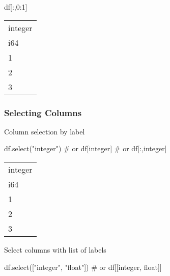 \documentclass[
  letterpaper,
  DIV=11,
  numbers=noendperiod]{scrartcl}
\newenvironment{Shaded}{\begin{snugshade}}{\end{snugshade}}
\newcommand{\CommentTok}[1]{\textcolor[rgb]{0.37,0.37,0.37}{#1}}
\newcommand{\DecValTok}[1]{\textcolor[rgb]{0.68,0.00,0.00}{#1}}
\newcommand{\NormalTok}[1]{\textcolor[rgb]{0.00,0.23,0.31}{#1}}
\newcommand{\StringTok}[1]{\textcolor[rgb]{0.13,0.47,0.30}{#1}}
\begin{document}
\begin{Shaded}
\begin{Highlighting}[]
\NormalTok{df[:,}\DecValTok{0}\NormalTok{:}\DecValTok{1}\NormalTok{]}
\end{Highlighting}
\end{Shaded}

\begin{longtable}[]{@{}l@{}}
\toprule()
integer \\
i64 \\
\midrule()
\endhead
1 \\
2 \\
3 \\
\bottomrule()
\end{longtable}

\hypertarget{selecting-columns}{%
\subsubsection{Selecting Columns}\label{selecting-columns}}

Column selection by label

\begin{Shaded}
\begin{Highlighting}[]
\NormalTok{df.select(}\StringTok{"integer"}\NormalTok{)}
\CommentTok{\# or df[\textquotesingle{}integer\textquotesingle{}]}
\CommentTok{\# or df[:,\textquotesingle{}integer\textquotesingle{}]}
\end{Highlighting}
\end{Shaded}

\begin{longtable}[]{@{}l@{}}
\toprule()
integer \\
i64 \\
\midrule()
\endhead
1 \\
2 \\
3 \\
\bottomrule()
\end{longtable}

Select columns with list of labels

\begin{Shaded}
\begin{Highlighting}[]
\NormalTok{df.select([}\StringTok{"integer"}\NormalTok{, }\StringTok{"float"}\NormalTok{])}
\CommentTok{\# or df[[\textquotesingle{}integer\textquotesingle{}, \textquotesingle{}float\textquotesingle{}]]}
\end{Highlighting}
\end{Shaded}
\end{document}
